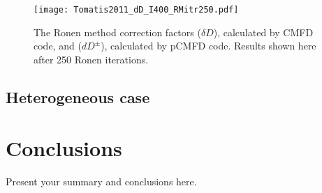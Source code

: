 \begin{figure}[!htbp]
	\centering
	\texttt{[image: Tomatis2011\_dD\_I400\_RMitr250.pdf]}
	\caption{The Ronen method correction factors ($\delta D$), calculated by CMFD code, and ($dD^{\pm}$), calculated by pCMFD code. Results shown here after 250 Ronen iterations.}
	\label{fig:slab-RM-dD}
\end{figure}

\subsection{Heterogeneous case}
\label{sec:heterog}






\section{Conclusions}
\label{sec:conc}

Present your summary and conclusions here.

%
